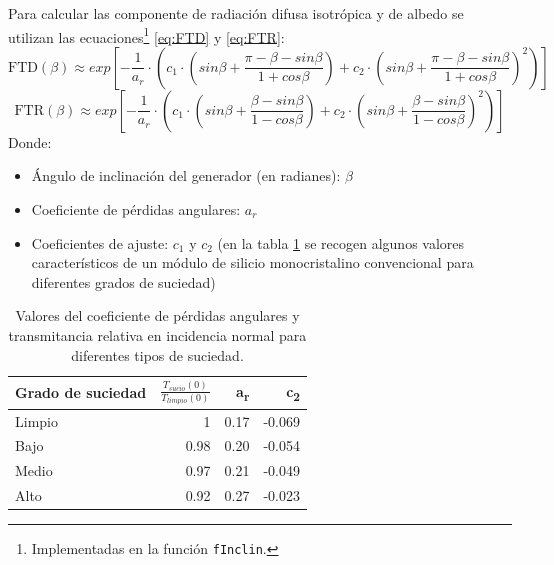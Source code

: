 Para calcular las componente de radiación difusa isotrópica y de albedo se utilizan las ecuaciones\footnote{Implementadas en la función \texttt{fInclin}.} \ref{eq:FTD} y \ref{eq:FTR}:
\begin{equation}
\text{FTD}(\beta) \approx exp[-\frac{1}{a_r}\cdot (c_1\cdot (sin\beta +\frac{\pi -\beta - sin\beta}{1+cos\beta})+c_2\cdot (sin\beta +\frac{\pi -\beta -sin\beta}{1+cos\beta})^2)]
\label{eq:FTD}
\end{equation}
\begin{equation}
\text{FTR}(\beta) \approx exp[-\frac{1}{a_r}\cdot (c_1\cdot (sin\beta +\frac{\beta - sin\beta}{1-cos\beta})+c_2\cdot (sin\beta +\frac{\beta -sin\beta}{1-cos\beta})^2)]
\end{equation}
\label{eq:FTR}
Donde:
\begin{itemize}
\item Ángulo de inclinación del generador (en radianes): \(\beta\) 
\item Coeficiente de pérdidas angulares: \(a_r\)
\item Coeficientes de ajuste: \(c_1\) y \(c_2\) (en la tabla \ref{tab:coef-perd} se recogen algunos valores característicos de un módulo de silicio monocristalino convencional para diferentes grados de suciedad)
\end{itemize}
\begin{table}[htbp]
\caption{Valores del coeficiente de pérdidas angulares y transmitancia relativa en incidencia normal para diferentes tipos de suciedad. \label{tab:coef-perd}}
\centering
\begin{tabular}{lrrr}
\hline
Grado de suciedad & \(\frac{T_{sucio}(0)}{T_{limpio}(0)}\) & a\textsubscript{r} & c\textsubscript{2}\\[0pt]
\hline
Limpio & 1 & 0.17 & -0.069\\[0pt]
\hline
Bajo & 0.98 & 0.20 & -0.054\\[0pt]
\hline
Medio & 0.97 & 0.21 & -0.049\\[0pt]
\hline
Alto & 0.92 & 0.27 & -0.023\\[0pt]
\hline
\end{tabular}
\end{table}

